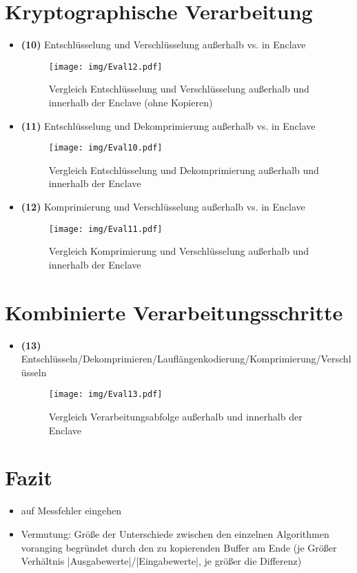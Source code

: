 \section{Kryptographische Verarbeitung}
\begin{itemize}	
	\item \textbf{(10)} Entschlüsselung und Verschlüsselung außerhalb vs. in Enclave
	\begin{figure}[h]
		\texttt{[image: img/Eval12.pdf]}
		\centering
		\caption{Vergleich Entschlüsselung und Verschlüsselung außerhalb und innerhalb der Enclave (ohne Kopieren)}
		\label{fig:eval12}
	\end{figure}
	
	\item \textbf{(11)} Entschlüsselung und Dekomprimierung außerhalb vs. in Enclave
	\begin{figure}[h]
		\texttt{[image: img/Eval10.pdf]}
		\centering
		\caption{Vergleich Entschlüsselung und Dekomprimierung außerhalb und innerhalb der Enclave}
		\label{fig:eval10}
	\end{figure}
	
	\item \textbf{(12)} Komprimierung und Verschlüsselung außerhalb vs. in Enclave
	\begin{figure}[h]
		\texttt{[image: img/Eval11.pdf]}
		\centering
		\caption{Vergleich Komprimierung und Verschlüsselung außerhalb und innerhalb der Enclave}
		\label{fig:eval11}
	\end{figure}
	
\end{itemize}

\section{Kombinierte Verarbeitungsschritte}

\begin{itemize}
	\item \textbf{(13)} Entschlüsseln/Dekomprimieren/Lauflängenkodierung/Komprimierung/Verschlüsseln
	\begin{figure}[h]
		\texttt{[image: img/Eval13.pdf]}
		\centering
		\caption{Vergleich Verarbeitungsabfolge außerhalb und innerhalb der Enclave}
		\label{fig:eval13}
	\end{figure}

\end{itemize}

\section{Fazit}

\begin{itemize}
	\item auf Messfehler eingehen
	\item Vermutung: Größe der Unterschiede zwischen den einzelnen Algorithmen voranging begründet durch den zu kopierenden Buffer am Ende (je Größer Verhältnis |Ausgabewerte|/|Eingabewerte|, je größer die Differenz)
\end{itemize}